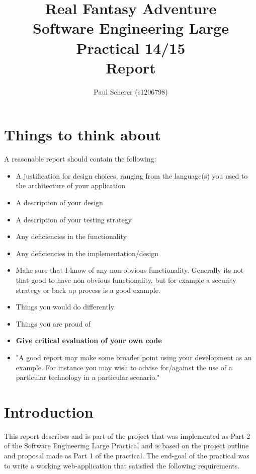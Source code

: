 \documentclass[11pt,a4paper]{article}
\begin{document}
\title{Real Fantasy Adventure \\
Software Engineering Large Practical 14/15 \\
Report}
\author{Paul Scherer (s1206798)}
\maketitle
\newpage

\tableofcontents
\newpage

\section{Things to think about}
A reasonable report should contain the following:
\begin{itemize}
\item A justification for design choices, ranging from the language(s) you used to the architecture of your application
\item A description of your design
\item A description of your testing strategy
\item Any deficiencies in the functionality
\item Any deficiencies in the implementation/design
\item Make sure that I know of any non-obvious functionality. Generally its not that good to have non obvious functionality, but for example a security strategy or back up process is a good example.
\item Things you would do differently
\item Things you are proud of
\item \textbf{Give critical evaluation of your own code}
\item "A good report may make some broader point using your development as an example. For instance you may wish to advise for/against the use of a particular technology in a particular scenario."
\end{itemize}

\section{Introduction}
This report describes and is part of the project that was implemented as Part 2 of the Software Engineering Large Practical and is based on the project outline and proposal made as Part 1 of the practical. The end-goal of the practical was to write a working web-application that satisfied the following requirements.
\end{document}
